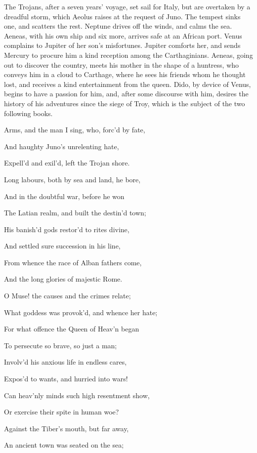 
The Trojans, after a seven years’ voyage, set sail for Italy, but are
overtaken by a dreadful storm, which Aeolus raises at the request of Juno. The
tempest sinks one, and scatters the rest. Neptune drives off the winds, and calms
the sea. Aeneas, with his own ship and six more, arrives safe at an African port.
Venus complains to Jupiter of her son’s misfortunes. Jupiter comforts her,
and sends Mercury to procure him a kind reception among the Carthaginians.
Aeneas, going out to discover the country, meets his mother in the shape of a
huntress, who conveys him in a cloud to Carthage, where he sees his friends
whom he thought lost, and receives a kind entertainment from the queen. Dido,
by device of Venus, begins to have a passion for him, and, after some discourse
with him, desires the history of his adventures since the siege of Troy,
which is the subject of the two following books.

Arms, and the man I sing, who, forc’d by fate,

And haughty Juno’s unrelenting hate,

Expell’d and exil’d, left the Trojan shore.

Long labours, both by sea and land, he bore,

And in the doubtful war, before he won

The Latian realm, and built the destin’d town;

His banish’d gods restor’d to rites divine,

And settled sure succession in his line,

From whence the race of Alban fathers come,

And the long glories of majestic Rome.

O Muse! the causes and the crimes relate;

What goddess was provok’d, and whence her hate;

For what offence the Queen of Heav’n began

To persecute so brave, so just a man;

Involv’d his anxious life in endless cares,

Expos’d to wants, and hurried into wars!

Can heav’nly minds such high resentment show,

Or exercise their spite in human woe?

Against the Tiber’s mouth, but far away,

An ancient town was seated on the sea;

